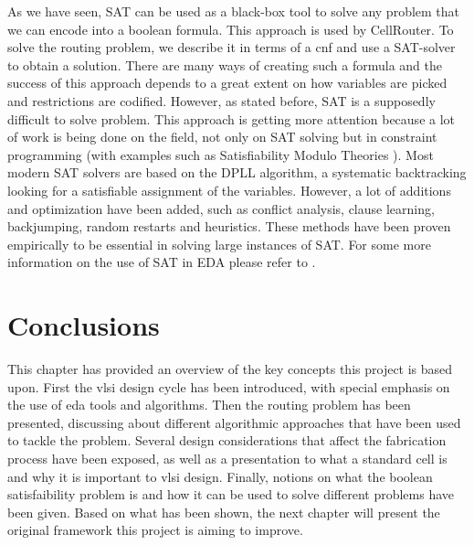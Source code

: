 As we have seen, SAT can be used as a black-box tool to solve any problem that we can encode into a boolean formula. This approach is used by CellRouter. To solve the routing problem, we describe it in terms of a \gls{cnf} and use a SAT-solver to obtain a solution. There are many ways of creating such a formula and the success of this approach depends to a great extent on how variables are picked and restrictions are codified. However, as stated before, SAT is a supposedly difficult to solve problem. This approach is getting more attention because a lot of work is being done on the field, not only on SAT solving but in constraint programming (with examples such as Satisfiability Modulo Theories \cite{roberto}). Most modern SAT solvers are based on the DPLL algorithm, a systematic backtracking looking for a satisfiable assignment of the variables. However, a lot of additions and optimization have been added, such as conflict analysis, clause learning, backjumping, random restarts and heuristics. These methods have been proven empirically to be essential in solving large instances of SAT. For some more information on the use of SAT in EDA please refer to \cite{joao}. \\

\section{Conclusions}

This chapter has provided an overview of the key concepts this project is based upon. First the \gls{vlsi} design cycle has been introduced, with special emphasis on the use of \gls{eda} tools and algorithms. Then the routing problem has been presented, discussing about different algorithmic approaches that have been used to tackle the problem. Several design considerations that affect the fabrication process have been exposed, as well as a presentation to what a standard cell is and why it is important to \gls{vlsi} design. Finally, notions on what the boolean satisfaibility problem is and how it can be used to solve different problems have been given. Based on what has been shown, the next chapter will present the original framework this project is aiming to improve.